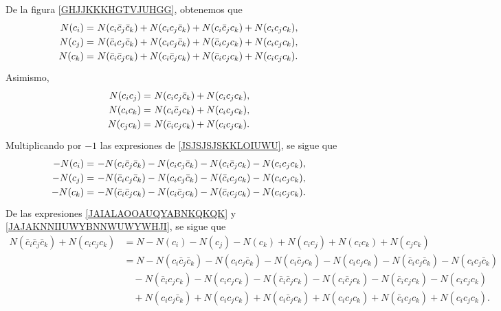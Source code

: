 \,\\
\noindent
De la figura \ref{GHJJKKKHGTVJUHGG}, obtenemos que
\begin{equation}
    {\extrarowheight = -0.5ex
    \renewcommand{\arraystretch}{1.5}
    \begin{array}{rl}
        N(c_i) = & \!\!\!\! N(c_i \bar{c}_j \bar{c}_k) + N(c_i c_j \bar{c}_k) + N(c_i \bar{c}_j c_k) + N(c_i c_j c_k), \\
        N(c_j) = & \!\!\!\! N(\bar{c}_i c_j \bar{c}_k) + N(c_i c_j \bar{c}_k) + N(\bar{c}_i c_j c_k) + N(c_i c_j c_k), \\
        N(c_k) = & \!\!\!\! N(\bar{c}_i \bar{c}_j c_k) + N(c_i \bar{c}_j c_k) + N(\bar{c}_i c_j c_k) + N(c_i c_j c_k).
    \end{array} } \label{JSJSJSJSKKLOIUWU}
\end{equation}
Asimismo,
\begin{equation}
    {\extrarowheight = -0.5ex
    \renewcommand{\arraystretch}{1.5}
    \begin{array}{rl}
        N(c_i c_j) = & \!\!\!\! N(c_i c_j \bar{c}_k) + N(c_i c_j c_k), \\
        N(c_i c_k) = & \!\!\!\! N(c_i \bar{c}_j c_k) + N(c_i c_j c_k), \\
        N(c_j c_k) = & \!\!\!\! N(\bar{c}_i c_j c_k) + N(c_i c_j c_k).
    \end{array} } \label{JAJAKNNIIUWYBNNWUWYWHJI}
\end{equation}
Multiplicando por $-1$ las expresiones de \eqref{JSJSJSJSKKLOIUWU}, se sigue que
\begin{equation}
    {\extrarowheight = -0.5ex
    \renewcommand{\arraystretch}{1.5}
    \begin{array}{rl}
        -N(c_i) = & \!\!\!\! -N(c_i \bar{c}_j \bar{c}_k) - N(c_i c_j \bar{c}_k) - N(c_i \bar{c}_j c_k) - N(c_i c_j c_k), \\
        -N(c_j) = & \!\!\!\! -N(\bar{c}_i c_j \bar{c}_k) - N(c_i c_j \bar{c}_k) - N(\bar{c}_i c_j c_k) - N(c_i c_j c_k), \\
        -N(c_k) = & \!\!\!\! -N(\bar{c}_i \bar{c}_j c_k) - N(c_i \bar{c}_j c_k) - N(\bar{c}_i c_j c_k) - N(c_i c_j c_k).
    \end{array} } \label{JAIALAOOAUQYABNKQKQK}
\end{equation}
De las expresiones \eqref{JAIALAOOAUQYABNKQKQK} y \eqref{JAJAKNNIIUWYBNNWUWYWHJI}, se sigue que
\begin{align*}
    N(\bar{c}_i \bar{c}_j \bar{c}_k) + N(c_i c_j c_k) & = N - N(c_i) - N(c_j) - N(c_k) + N(c_i c_j) + N(c_i c_k) + N(c_j c_k) \\
    & = N - N(c_i \bar{c}_j \bar{c}_k) - N(c_i c_j \bar{c}_k) - N(c_i \bar{c}_j c_k) - N(c_i c_j c_k) -N(\bar{c}_i c_j \bar{c}_k) - N(c_i c_j \bar{c}_k) \\
    & \quad - N(\bar{c}_i c_j c_k) - N(c_i c_j c_k) - N(\bar{c}_i \bar{c}_j c_k) - N(c_i \bar{c}_j c_k) - N(\bar{c}_i c_j c_k) - N(c_i c_j c_k) \\
    & \quad + N(c_i c_j \bar{c}_k) + N(c_i c_j c_k) + N(c_i \bar{c}_j c_k) + N(c_i c_j c_k) + N(\bar{c}_i c_j c_k) + N(c_i c_j c_k).
\end{align*}
